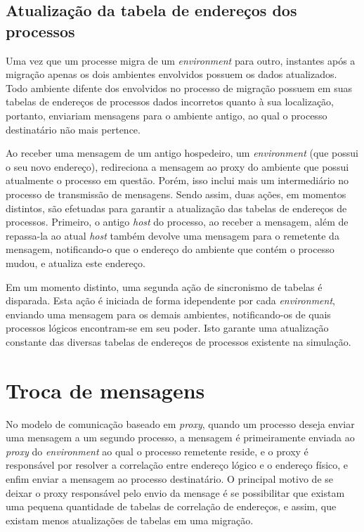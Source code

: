 \subsection{Atualização da tabela de endereços dos processos \label{atualizacao}}

Uma vez que um processe migra de um \textit{environment} para outro, instantes após a migração apenas os dois ambientes envolvidos possuem os dados atualizados. Todo ambiente difente dos envolvidos no processo de migração possuem em suas tabelas de endereços de processos dados incorretos quanto à sua localização, portanto, enviariam mensagens para o ambiente antigo, ao qual o processo destinatário não mais pertence.

Ao receber uma mensagem de um antigo hospedeiro, um \textit{environment} (que possui o seu novo endereço), redireciona a mensagem ao proxy do ambiente que possui atualmente o processo em questão. Porém, isso inclui mais um intermediário no processo de transmissão de mensagens. Sendo assim, duas ações, em momentos distintos, são efetuadas para garantir a atualização das tabelas de endereços de processos. Primeiro, o antigo \textit{host} do processo, ao receber a mensagem, além de repassa-la ao atual \textit{host} também devolve uma mensagem para o remetente da mensagem, notificando-o que o endereço do ambiente que contém o processo mudou, e atualiza este endereço.

Em um momento distinto, uma segunda ação de sincronismo de tabelas é disparada. Esta ação é iniciada de forma idependente por cada \textit{environment}, enviando uma mensagem para os demais ambientes, notificando-os de quais processos lógicos encontram-se em seu poder. Isto garante uma atualização constante das diversas tabelas de endereços de processos existente na simulação.

\section{Troca de mensagens \label{troca_mensagens}}

No modelo de comunicação baseado em \textit{proxy}, quando um processo deseja enviar uma mensagem a um segundo processo, a mensagem é primeiramente enviada ao \textit{proxy} do \textit{environment} ao qual o processo remetente reside, e o proxy é responsável por resolver a correlação entre endereço lógico e o endereço físico, e enfim enviar a mensagem ao processo destinatário. O principal motivo de se deixar o proxy responsável pelo envio da mensage é se possibilitar que existam uma pequena quantidade de tabelas de correlação de endereços, e assim, que existam menos atualizações de tabelas em uma migração.

